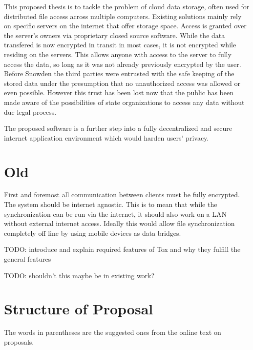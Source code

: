 \documentclass[twoside]{article}
\begin{document}
This proposed thesis is to tackle the problem of cloud data storage, often used for distributed file access across multiple computers.
Existing solutions mainly rely on specific servers on the internet that offer storage space.
Access is granted over the server's owners via proprietary closed source software.
While the data transfered is now encrypted in transit in most cases, it is not encrypted while residing on the servers.
This allows anyone with access to the server to fully access the data, so long as it was not already previously encrypted by the user.
Before Snowden the third parties were entrusted with the safe keeping of the stored data under the presumption that no unauthorized access was allowed or even possible.
However this trust has been lost now that the public has been made aware of the possibilities of state organizations to access any data without due legal process.


The proposed software is a further step into a fully decentralized and secure internet application environment which would harden users' privacy.

\section{Old}

First and foremost all communication between clients must be fully encrypted.
The system should be internet agnostic.
This is to mean that while the synchronization can be run via the internet, it should also work on a LAN without external internet access.
Ideally this would allow file synchronization completely off line by using mobile devices as data bridges.

TODO: introduce and explain required features of Tox and why they fulfill the general features

TODO: shouldn’t this maybe be in existing work?

\section{Structure of Proposal}

The words in parentheses are the suggested ones from the online text on proposals.
\end{document}
